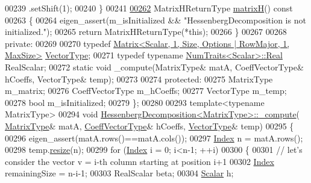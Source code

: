 \begin{DoxyCode}
00239              .setShift(1);
00240     \}
00241 
\hyperlink{group___eigenvalues___module_a8e781d2e22a2304647bcf0ae913cc8ea}{00262}     MatrixHReturnType \hyperlink{group___eigenvalues___module_a8e781d2e22a2304647bcf0ae913cc8ea}{matrixH}()\textcolor{keyword}{ const}
00263 \textcolor{keyword}{    }\{
00264       eigen\_assert(m\_isInitialized && \textcolor{stringliteral}{"HessenbergDecomposition is not initialized."});
00265       \textcolor{keywordflow}{return} MatrixHReturnType(*\textcolor{keyword}{this});
00266     \}
00267 
00268   \textcolor{keyword}{private}:
00269 
00270     \textcolor{keyword}{typedef} \hyperlink{group___core___module}{Matrix<Scalar, 1, Size, Options | RowMajor, 1, MaxSize>}
       \hyperlink{group___core___module}{VectorType};
00271     \textcolor{keyword}{typedef} \textcolor{keyword}{typename} \hyperlink{group___core___module_struct_eigen_1_1_num_traits}{NumTraits<Scalar>::Real} RealScalar;
00272     \textcolor{keyword}{static} \textcolor{keywordtype}{void} \_compute(MatrixType& matA, CoeffVectorType& hCoeffs, VectorType& temp);
00273 
00274   \textcolor{keyword}{protected}:
00275     MatrixType m\_matrix;
00276     CoeffVectorType m\_hCoeffs;
00277     VectorType m\_temp;
00278     \textcolor{keywordtype}{bool} m\_isInitialized;
00279 \};
00280 
00293 \textcolor{keyword}{template}<\textcolor{keyword}{typename} MatrixType>
00294 \textcolor{keywordtype}{void} \hyperlink{group___eigenvalues___module_class_eigen_1_1_hessenberg_decomposition}{HessenbergDecomposition<MatrixType>::\_compute}(
      \hyperlink{group___eigenvalues___module_a93a611350a7db9d1da18f2c828ecea9f}{MatrixType}& matA, \hyperlink{group___core___module}{CoeffVectorType}& hCoeffs, \hyperlink{group___core___module}{VectorType}& temp)
00295 \{
00296   eigen\_assert(matA.rows()==matA.cols());
00297   \hyperlink{group___eigenvalues___module_a8e287ac222f53e2c8ce82faa43e95ac6}{Index} n = matA.rows();
00298   temp.\hyperlink{class_eigen_1_1_plain_object_base_a99d9054ee2d5a40c6e00ded0265e9cea}{resize}(n);
00299   \textcolor{keywordflow}{for} (\hyperlink{group___eigenvalues___module_a8e287ac222f53e2c8ce82faa43e95ac6}{Index} i = 0; i<n-1; ++i)
00300   \{
00301     \textcolor{comment}{// let's consider the vector v = i-th column starting at position i+1}
00302     \hyperlink{group___eigenvalues___module_a8e287ac222f53e2c8ce82faa43e95ac6}{Index} remainingSize = n-i-1;
00303     RealScalar beta;
00304     \hyperlink{group___eigenvalues___module_a9420c36226cae7d92da8308a3f97ac2f}{Scalar} h;

\end{DoxyCode}
